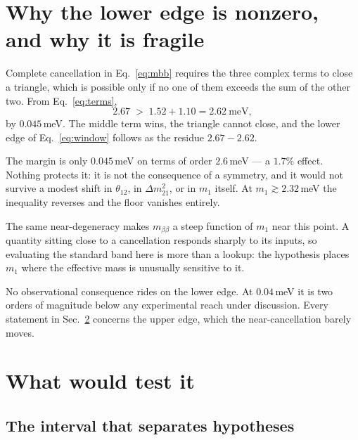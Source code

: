 \documentclass[aps,prd,twocolumn,superscriptaddress,nofootinbib,10pt]{revtex4-2}
\begin{document}
\section{Why the lower edge is nonzero, and why it is fragile}\label{sec:floor}

Complete cancellation in Eq.~\eqref{eq:mbb} requires the three complex terms to close a triangle,
which is possible only if no one of them exceeds the sum of the other two. From
Eq.~\eqref{eq:terms},
%
\begin{equation}
  2.67 \;>\; 1.52 + 1.10 = 2.62 \ \mathrm{meV},
  \label{eq:triangle}
\end{equation}
%
by $0.045\,$meV. The middle term wins, the triangle cannot close, and the lower edge of
Eq.~\eqref{eq:window} follows as the residue $2.67 - 2.62$.

The margin is only $0.045\,$meV on terms of order $2.6\,$meV --- a $1.7\%$ effect. Nothing protects
it: it is not the consequence of a symmetry, and it would not survive a modest shift in
$\theta_{12}$, in $\Delta m^2_{21}$, or in $m_1$ itself. At $m_1 \gtrsim 2.32\,$meV the inequality
reverses and the floor vanishes entirely.

The same near-degeneracy makes $m_{\beta\beta}$ a steep function of $m_1$ near this point. A quantity
sitting close to a cancellation responds sharply to its inputs, so evaluating the standard band here
is more than a lookup: the hypothesis places $m_1$ where the effective mass is unusually sensitive
to it.

No observational consequence rides on the lower edge. At $0.04\,$meV it is two orders of magnitude
below any experimental reach under discussion. Every statement in Sec.~\ref{sec:test} concerns the
upper edge, which the near-cancellation barely moves.

\section{What would test it}\label{sec:test}

\subsection{The interval that separates hypotheses}
\end{document}

